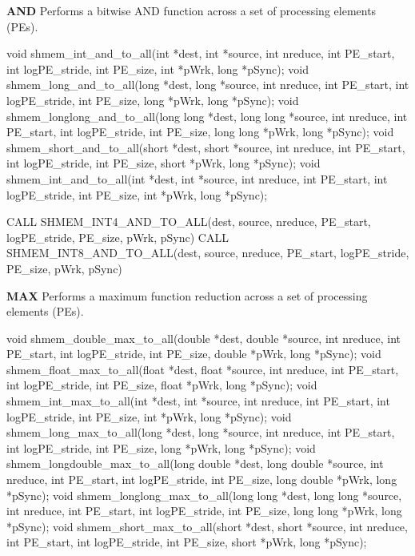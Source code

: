 
\textbf{AND} \newline
Performs a bitwise AND function across a set of processing elements (\ac{PE}s).\newline
\synC %

void shmem_int_and_to_all(int *dest, int *source, int nreduce, int PE_start, int logPE_stride, int PE_size, int *pWrk, long *pSync);
void shmem_long_and_to_all(long *dest, long *source, int nreduce, int PE_start, int logPE_stride, int PE_size, long *pWrk, long *pSync);
void shmem_longlong_and_to_all(long long *dest, long long *source, int nreduce, int PE_start, int logPE_stride, int PE_size, long long *pWrk, long *pSync);
void shmem_short_and_to_all(short *dest, short *source, int nreduce, int PE_start, int logPE_stride, int PE_size, short *pWrk, long *pSync);
void shmem_int_and_to_all(int *dest, int *source, int nreduce, int PE_start, int logPE_stride, int PE_size, int *pWrk, long *pSync);

\synF %

CALL SHMEM_INT4_AND_TO_ALL(dest, source, nreduce, PE_start, logPE_stride, PE_size, pWrk, pSync)
CALL SHMEM_INT8_AND_TO_ALL(dest, source, nreduce, PE_start, logPE_stride, PE_size, pWrk, pSync)

\bigskip
\textbf{MAX} \newline
Performs a maximum function reduction across a set of processing elements (\ac{PE}s).\newline
\synC %

void shmem_double_max_to_all(double *dest, double *source, int nreduce, int PE_start, int logPE_stride, int PE_size, double *pWrk, long *pSync);
void shmem_float_max_to_all(float *dest, float *source, int nreduce, int PE_start, int logPE_stride, int PE_size, float *pWrk, long *pSync);
void shmem_int_max_to_all(int *dest, int *source, int nreduce, int PE_start, int logPE_stride, int PE_size, int *pWrk, long *pSync);
void shmem_long_max_to_all(long *dest, long *source, int nreduce, int PE_start, int logPE_stride, int PE_size, long *pWrk, long *pSync);
void shmem_longdouble_max_to_all(long double *dest, long double *source, int nreduce, int PE_start, int logPE_stride, int PE_size, long double *pWrk, long *pSync);
void shmem_longlong_max_to_all(long long *dest, long long *source, int nreduce, int PE_start, int logPE_stride, int PE_size, long long *pWrk, long *pSync);
void shmem_short_max_to_all(short *dest, short *source, int nreduce, int PE_start, int logPE_stride, int PE_size, short *pWrk, long *pSync);

